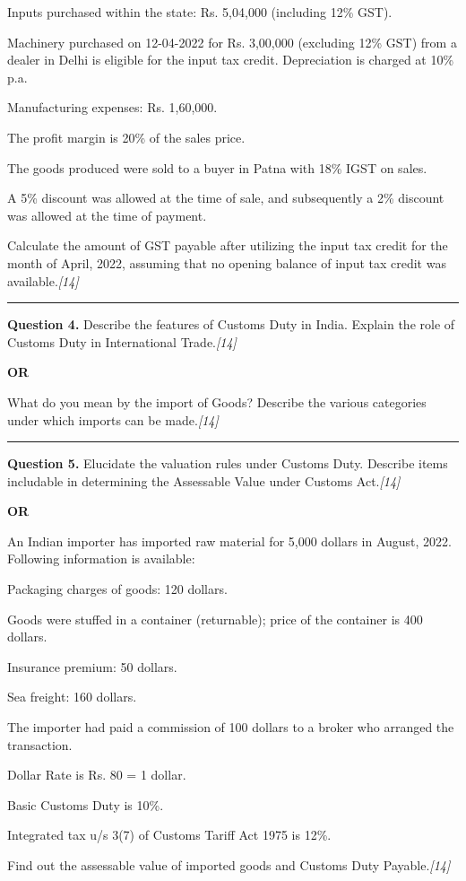 \documentclass[11pt,a4paper]{article}
\newcommand{\pts}[1]{\hfill   \textit{[#1]}}
\begin{document}
\begin{parts}
  \item Inputs purchased within the state: Rs. 5,04,000 (including 12\% GST).
  \item Machinery purchased on 12-04-2022 for Rs. 3,00,000 (excluding 12\% GST) from a dealer in Delhi is eligible for the input tax credit. Depreciation is charged at 10\% p.a.
  \item Manufacturing expenses: Rs. 1,60,000.
  \item The profit margin is 20\% of the sales price.
  \item The goods produced were sold to a buyer in Patna with 18\% IGST on sales.
  \item A 5\% discount was allowed at the time of sale, and subsequently a 2\% discount was allowed at the time of payment.
\end{parts}
Calculate the amount of GST payable after utilizing the input tax credit for the month of April, 2022, assuming that no opening balance of input tax credit was available.\pts{14}

\medskip\rule{\linewidth}{0.2pt}




\noindent   \textbf{Question 4.}
Describe the features of Customs Duty in India. Explain the role of Customs Duty in International Trade.\pts{14}

\centerline{   \textbf{OR}}

What do you mean by the import of Goods? Describe the various categories under which imports can be made.\pts{14}

\medskip\rule{\linewidth}{0.2pt}




\noindent   \textbf{Question 5.}
Elucidate the valuation rules under Customs Duty. Describe items includable in determining the Assessable Value under Customs Act.\pts{14}

\centerline{   \textbf{OR}}

An Indian importer has imported raw material for 5,000 dollars in August, 2022. Following information is available:

\begin{parts}
  \item Packaging charges of goods: 120 dollars.
  \item Goods were stuffed in a container (returnable); price of the container is 400 dollars.
  \item Insurance premium: 50 dollars.
  \item Sea freight: 160 dollars.
  \item The importer had paid a commission of 100 dollars to a broker who arranged the transaction.
  \item Dollar Rate is Rs. 80 = 1 dollar.
  \item Basic Customs Duty is 10\%.
  \item Integrated tax u/s 3(7) of Customs Tariff Act 1975 is 12\%.
\end{parts}
Find out the assessable value of imported goods and Customs Duty Payable.\pts{14}
\end{document}
